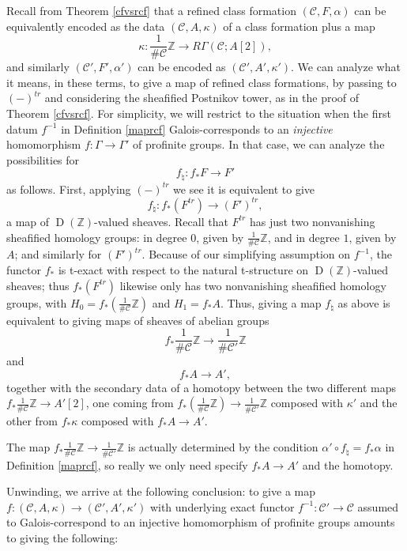 \documentclass[12pt]{article}
\theoremstyle{definition}
\newcommand{\on}{\operatorname}
\newcommand{\mc}{\mathcal}
\newcommand{\mbb}{\mathbb}
\begin{document}
Recall from Theorem \ref{cfvsrcf} that a refined class formation $(\mc{C},F,\alpha)$ can be equivalently encoded as the data $(\mc{C},A,\kappa)$ of a class formation plus a map
$$\kappa: \frac{1}{\#\mc{C}}\mbb{Z} \to R\Gamma(\mc{C};A[2]),$$
and similarly $(\mc{C}',F',\alpha')$ can be encoded as $(\mc{C}',A',\kappa')$.  We can analyze what it means, in these terms, to give a map of refined class formations, by passing to $(-)^{tr}$ and considering the sheafified Postnikov tower, as in the proof of Theorem \ref{cfvsrcf}.  For simplicity, we will restrict to the situation when the first datum $f^{-1}$ in Definition \ref{maprcf} Galois-corresponds to an \emph{injective} homomorphism $f:\Gamma\to\Gamma'$ of profinite groups.  In that case, we can analyze the possibilities for
$$f_\natural:f_\ast F\to F'$$
as follows.  First, applying $(-)^{tr}$ we see it is equivalent to give
$$f_\natural:f_\ast (F^{tr}) \to (F')^{tr},$$
a map of $\on{D}(\mbb{Z})$-valued sheaves.  Recall that $F^{tr}$ has just two nonvanishing sheafified homology groups: in degree $0$, given by $\frac{1}{\#\mc{C}}\mbb{Z}$, and in degree $1$, given by $A$; and similarly for $(F')^{tr}$.  Because of our simplifying assumption on $f^{-1}$, the functor $f_\ast$ is t-exact with respect to the natural t-structure on $\on{D}(\mbb{Z})$-valued sheaves; thus $f_\ast(F^{tr})$ likewise only has two nonvanishing sheafified homology groups, with $H_0 = f_\ast (\frac{1}{\#\mc{C}}\mbb{Z})$ and $H_1=f_\ast A$.  Thus, giving a map $f_\natural$ as above is equivalent to giving maps of sheaves of abelian groups
$$f_\ast \frac{1}{\#\mc{C}}\mbb{Z}\to \frac{1}{\#\mc{C}'}\mbb{Z}$$
and
$$f_\ast A \to A',$$
together with the secondary data of a homotopy between the two different maps $f_\ast \frac{1}{\#\mc{C}}\mbb{Z} \to A'[2]$, one coming from $f_\ast (\frac{1}{\#\mc{C}}\mbb{Z})\to \frac{1}{\#\mc{C}'}\mbb{Z}$ composed with $\kappa'$ and the other from $f_\ast \kappa$ composed with $f_\ast A \to A'$.

The map $f_\ast\frac{1}{\#\mc{C}}\mbb{Z} \to \frac{1}{\#\mc{C}'}\mbb{Z}$ is actually determined by the condition $\alpha'\circ f_\natural = f_\ast \alpha$ in Definition \ref{maprcf}, so really we only need specify $f_\ast A\to A'$ and the homotopy.

Unwinding, we arrive at the following conclusion: to give a map $f:(\mc{C},A,\kappa) \to (\mc{C}',A',\kappa')$ with underlying exact functor $f^{-1}:\mc{C}'\to \mc{C}$ assumed to Galois-correspond to an injective homomorphism of profinite groups amounts to giving the following:
\end{document}

